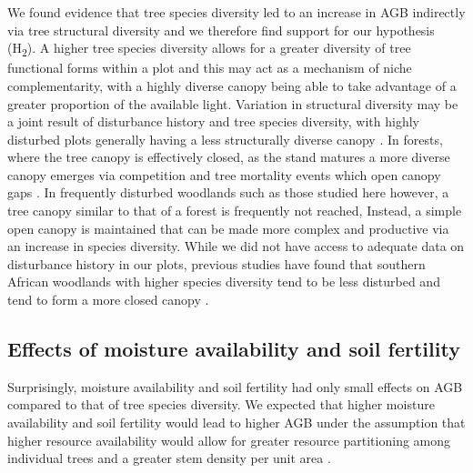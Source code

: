 \documentclass[11pt,a4paper]{article}
\begin{document}
We found evidence that tree species diversity led to an increase in AGB indirectly via tree structural diversity and we therefore find support for our hypothesis (H\textsubscript{2}). A higher tree species diversity allows for a greater diversity of tree functional forms within a plot and this may act as a mechanism of niche complementarity, with a highly diverse canopy being able to take advantage of a greater proportion of the available light. Variation in structural diversity may be a joint result of disturbance history and tree species diversity, with highly disturbed plots generally having a less structurally diverse canopy \citep{LaRue2019}. In forests, where the tree canopy is effectively closed, as the stand matures a more diverse canopy emerges via competition and tree mortality events which open canopy gaps \citep{Muscolo2014}. In frequently disturbed woodlands such as those studied here however, a tree canopy similar to that of a forest is frequently not reached, Instead, a simple open canopy is maintained that can be made more complex and productive via an increase in species diversity. While we did not have access to adequate data on disturbance history in our plots, previous studies have found that southern African woodlands with higher species diversity tend to be less disturbed and tend to form a more closed canopy \citep{Chidumayo2013, Mutowo2012}.

\subsection{Effects of moisture availability and soil fertility}

Surprisingly, moisture availability and soil fertility had only small effects on AGB compared to that of tree species diversity. We expected that higher moisture availability and soil fertility would lead to higher AGB under the assumption that higher resource availability would allow for greater resource partitioning among individual trees and a greater stem density per unit area \citep{Kraaij2006, Shirima2015}.
\end{document}
